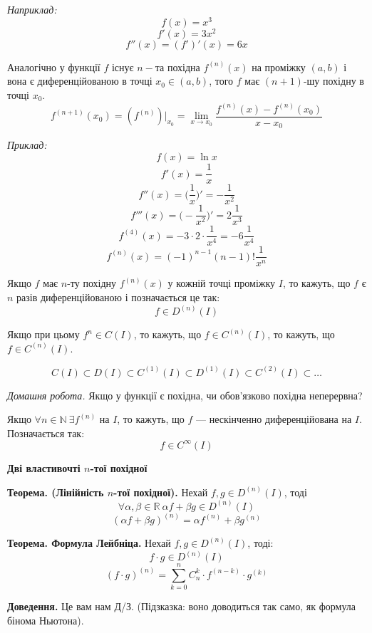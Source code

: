 \documentclass[12pt]{report}
\begin{document}
\textit{Наприклад:}
$$f(x) = x^3$$
$$f'(x) = 3 x^2$$
$$f''(x) = (f')'(x) = 6x$$

Аналогічно у функції $f$ існує $n-$та  похідна $f^{(n)}(x)$ на проміжку $(a,b)$ і вона є диференційованою в точці $x_0 \in (a,b)$, того
$f$ має $(n+1)$-шу похідну в точці $x_0$.
$$f^{(n+1)}(x_0) = (f^{(n)})|_{x_0} = \lim_{x\to x_0}\frac{f^{(n)}(x) - f^{(n)}(x_0)}{x - x_0}$$

\textit{Приклад:}
$$f(x) = \ln x$$
$$f'(x) = \frac{1}{x}$$
$$f''(x) = \Big( \frac{1}{x} \Big)' = -\frac{1}{x^2}$$
$$f'''(x) = \Big( -\frac{1}{x^2} \Big)' = 2\frac{1}{x^3}$$
$$f^{(4)}(x) = -3 \cdot 2 \cdot \frac{1}{x^4} = -6 \frac{1}{x^4}$$
$$f^{(n)}(x) = (-1)^{n-1}(n-1)!\frac{1}{x^n}$$

Якщо $f$ має $n$-ту похідну $f^{(n)}(x)$ у кожній точці проміжку $I$, то кажуть, що $f$ є $n$ разів диференційованою і позначається це так:
$$f \in D^{(n)}(I)$$

Якщо при цьому $f^{n} \in C(I)$, то кажуть, що $f \in C^{(n)}(I)$, то кажуть, що $f \in C^{(n)}(I)$.

$$C(I) \subset D(I) \subset C^{(1)}(I) \subset D^{(1)}(I) \subset C^{(2)}(I) \subset \ldots$$

\textit{Домашня робота.} Якщо у функції є похідна, чи обов'язково похідна неперервна?

\vspace{3mm}

Якщо $\forall n \in \mathbb{N}\ \exists f^{(n)}$ на $I$, то кажуть, що $f$ --- нескінченно диференційована на $I$. Позначається так:
$$f \in C^{\infty}(I)$$

\begin{center}

\textbf{\large{Дві властивочті $n$-тої похідної}}

\end{center}

\textbf{Теорема. (Лінійність $n$-тої похідної).} Нехай $f,g \in D^{(n)}(I)$, тоді 
$$\forall \alpha, \beta \in \mathbb{R}\ \alpha f  +\beta g \in D^{(n)}(I)$$
$$(\alpha f + \beta g)^{(n)} = \alpha f^{(n)} + \beta g^{(n)}$$

\textbf{Теорема. Формула Лейбніца.} Нехай $f,g \in D^{(n)}(I)$, тоді: 
$$f \cdot g \in D^{(n)}(I)$$
$$(f \cdot g)^{(n)} = \sum_{k = 0}^{n} C_n^k \cdot f^{(n-k)} \cdot g^{(k)}$$

\textbf{Доведення.} Це вам нам Д/З. (Підзказка: воно доводиться так само, як формула бінома Ньютона).

\vspace{3mm}
\end{document}
